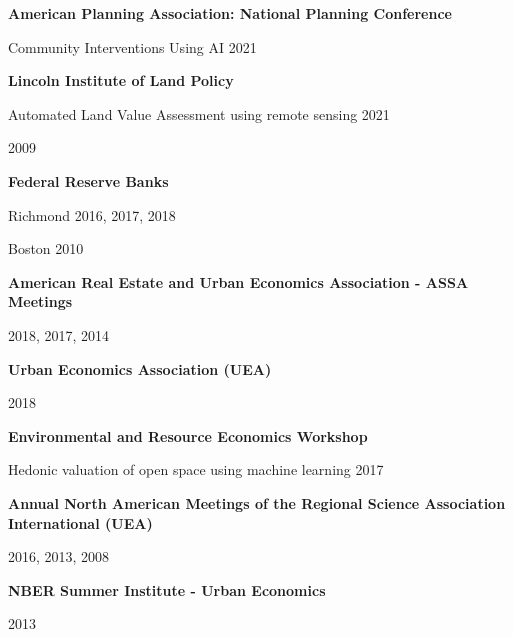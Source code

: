 \documentclass[10pt]{article}
\begin{document}
\begin{outerlist}
\item[] \textbf{American Planning Association: National Planning Conference}
    \begin{innerlist}
    \item[] Community Interventions Using AI 2021
    \end{innerlist}
\item[] \textbf{Lincoln Institute of Land Policy}
    \begin{innerlist}
    \item[] Automated Land Value Assessment using remote sensing 2021
    \item[] 2009
    \end{innerlist}
\item[] \textbf{Federal Reserve Banks}
    \begin{innerlist}
    \item[] Richmond 2016, 2017, 2018
    \item[] Boston  2010
    \end{innerlist}
\item[] \textbf{American Real Estate and Urban Economics Association - ASSA Meetings}
    \begin{innerlist}
    \item[] 2018, 2017, 2014
    \end{innerlist}
\item[] \textbf{Urban Economics Association (UEA)}
    \begin{innerlist}
    \item[] 2018
    \end{innerlist}
\item[] \textbf{Environmental and Resource Economics Workshop}
    \begin{innerlist}
    \item[] Hedonic valuation of open space using machine learning 2017
    \end{innerlist}
\item[] \textbf{Annual North American Meetings of the Regional Science Association International (UEA)}
    \begin{innerlist}
    \item[] 2016, 2013, 2008
    \end{innerlist}
\item[] \textbf{NBER Summer Institute - Urban Economics}
    \begin{innerlist}
    \item[] 2013
    \end{innerlist}

\end{outerlist}
\end{document}
